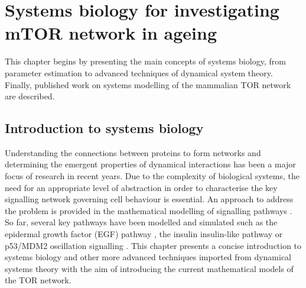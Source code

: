 \graphicspath{{Chapter4/Chapter4Figs/}}

\chapter{Systems biology for investigating mTOR network in ageing}
\label{chap:Systems biology for investigating mTOR network in ageing}
This chapter begins by presenting the main concepts of systems biology, from parameter estimation to advanced techniques of dynamical system theory. Finally, published work on systems modelling of the mammalian TOR network are described.

\section{Introduction to systems biology}
\label{sec:Introduction to systems biology}
Understanding the connections between proteins to form networks and determining the emergent properties of dynamical interactions has been a major focus of research in recent years. Due to the complexity of biological systems, the need for an appropriate level of abstraction in order to characterise the key signalling network governing cell behaviour is essential. An approach to address the problem is provided in the mathematical modelling of signalling pathways \citep{Kolch2005, Hughey2009}. So far, several key pathways have been modelled and simulated such as the epidermal growth factor (EGF) pathway \citep{Borisov2009, Schilling2009, Wang2009}, the insulin insulin-like pathway \citep{smith2010foxo_modelling, Brannmark2010, Nyman2012} or p53/MDM2 oscillation signalling \citep{GevaZatorsky2006, Proctor2008}. This chapter presents a concise introduction to systems biology and other more advanced techniques imported from dynamical systems theory with the aim of introducing the current mathematical models of 
the TOR network.\\

